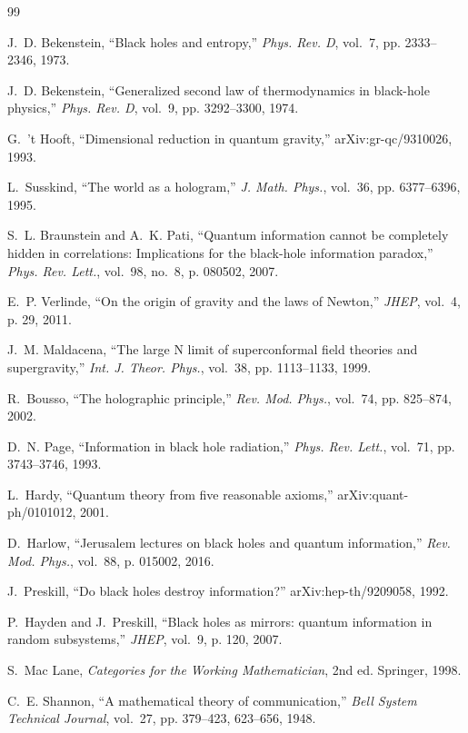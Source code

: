 ﻿\documentclass[12pt]{article}
\begin{document}
\begin{thebibliography}{99}


J.~D. Bekenstein, ``Black holes and entropy,'' \emph{Phys. Rev. D}, vol.~7, pp. 2333--2346, 1973.


J.~D. Bekenstein, ``Generalized second law of thermodynamics in black-hole physics,'' \emph{Phys. Rev. D}, vol.~9, pp. 3292--3300, 1974.


G.~'t Hooft, ``Dimensional reduction in quantum gravity,'' arXiv:gr-qc/9310026, 1993.


L.~Susskind, ``The world as a hologram,'' \emph{J. Math. Phys.}, vol.~36, pp. 6377--6396, 1995.


S.~L. Braunstein and A.~K. Pati, ``Quantum information cannot be completely hidden in correlations: Implications for the black-hole information paradox,'' \emph{Phys. Rev. Lett.}, vol.~98, no.~8, p. 080502, 2007.


E.~P. Verlinde, ``On the origin of gravity and the laws of Newton,'' \emph{JHEP}, vol.~4, p. 29, 2011.


J.~M. Maldacena, ``The large N limit of superconformal field theories and supergravity,'' \emph{Int. J. Theor. Phys.}, vol.~38, pp. 1113--1133, 1999.


R.~Bousso, ``The holographic principle,'' \emph{Rev. Mod. Phys.}, vol.~74, pp. 825--874, 2002.


D.~N. Page, ``Information in black hole radiation,'' \emph{Phys. Rev. Lett.}, vol.~71, pp. 3743--3746, 1993.


L.~Hardy, ``Quantum theory from five reasonable axioms,'' arXiv:quant-ph/0101012, 2001.


D.~Harlow, ``Jerusalem lectures on black holes and quantum information,'' \emph{Rev. Mod. Phys.}, vol.~88, p. 015002, 2016.


J.~Preskill, ``Do black holes destroy information?'' arXiv:hep-th/9209058, 1992.


P.~Hayden and J.~Preskill, ``Black holes as mirrors: quantum information in random subsystems,'' \emph{JHEP}, vol.~9, p. 120, 2007.


S.~Mac Lane, \emph{Categories for the Working Mathematician}, 2nd ed. Springer, 1998.


C.~E. Shannon, ``A mathematical theory of communication,'' \emph{Bell System Technical Journal}, vol.~27, pp. 379--423, 623--656, 1948.


\end{thebibliography}
\end{document}
